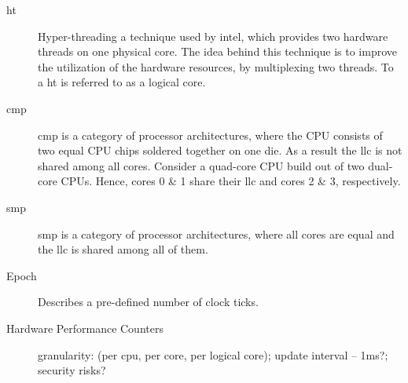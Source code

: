 \begin{description}
  \item[\Gls{ht}] Hyper-threading a technique used by \gls{intel}, which provides
    two hardware threads on one physical core.
    The idea behind this technique is to improve the utilization of the
    hardware resources, by multiplexing two threads.
    To a \Gls{ht} is referred to as a logical core.

  \item[\Gls{cmp}] \gls{cmp} is a category of processor architectures, where
    the CPU consists of two equal CPU chips soldered together on one die.
    As a result the \gls{llc} is not shared among all cores.
    Consider a quad-core CPU build out of two dual-core CPUs.
    Hence, cores 0 \& 1 share their \gls{llc} and cores 2 \& 3, respectively.

  \item[\Gls{smp}] \gls{smp} is a category of processor architectures, where
    all cores are equal and the \gls{llc} is shared among all of them.

  \item[Epoch] Describes a pre-defined number of clock ticks.

  \item[Hardware Performance Counters]  granularity: (per
    cpu, per core, per logical core);
    update interval -- 1ms?;
    security risks?



\end{description}

